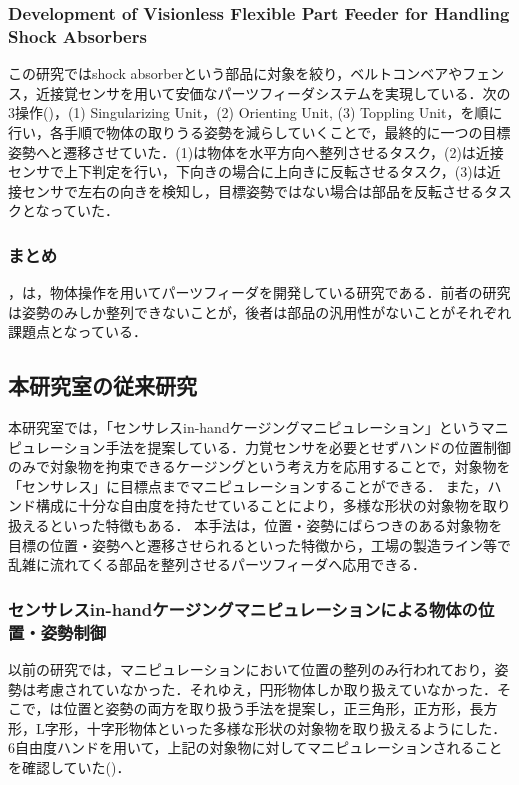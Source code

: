 \documentclass[a4paper,twoside,12pt,papersize, dvipdfmx]{iirthesis}
\begin{document}
\subsubsection{Development of Visionless Flexible Part Feeder for Handling Shock Absorbers \cite{udhayakumar2021}}
この研究ではshock absorberという部品に対象を絞り，ベルトコンベアやフェンス，近接覚センサを用いて安価なパーツフィーダシステムを実現している．次の3操作()，(1) Singularizing Unit，(2) Orienting Unit, (3) Toppling Unit，を順に行い，各手順で物体の取りうる姿勢を減らしていくことで，最終的に一つの目標姿勢へと遷移させていた．(1)は物体を水平方向へ整列させるタスク，(2)は近接センサで上下判定を行い，下向きの場合に上向きに反転させるタスク，(3)は近接センサで左右の向きを検知し，目標姿勢ではない場合は部品を反転させるタスクとなっていた．


\subsubsection{まとめ}
\cite{akella2000}，\cite{udhayakumar2021}は，物体操作を用いてパーツフィーダを開発している研究である．前者の研究は姿勢のみしか整列できないことが，後者は部品の汎用性がないことがそれぞれ課題点となっている．

\subsection{本研究室の従来研究}
本研究室では，「センサレスin-handケージングマニピュレーション」というマニピュレーション手法を提案している．力覚センサを必要とせずハンドの位置制御のみで対象物を拘束できるケージングという考え方を応用することで，対象物を「センサレス」に目標点までマニピュレーションすることができる．
また，ハンド構成に十分な自由度を持たせていることにより，多様な形状の対象物を取り扱えるといった特徴もある．
本手法は，位置・姿勢にばらつきのある対象物を目標の位置・姿勢へと遷移させられるといった特徴から，工場の製造ライン等で乱雑に流れてくる部品を整列させるパーツフィーダへ応用できる．

\subsubsection{センサレスin-handケージングマニピュレーションによる物体の位置・姿勢制御 \cite{komiyama2021}}
以前の研究\cite{asamura2013}では，マニピュレーションにおいて位置の整列のみ行われており，姿勢は考慮されていなかった．それゆえ，円形物体しか取り扱えていなかった．そこで，\cite{komiyama2021}は位置と姿勢の両方を取り扱う手法を提案し，正三角形，正方形，長方形，L字形，十字形物体といった多様な形状の対象物を取り扱えるようにした．
6自由度ハンドを用いて，上記の対象物に対してマニピュレーションされることを確認していた()．
\end{document}

